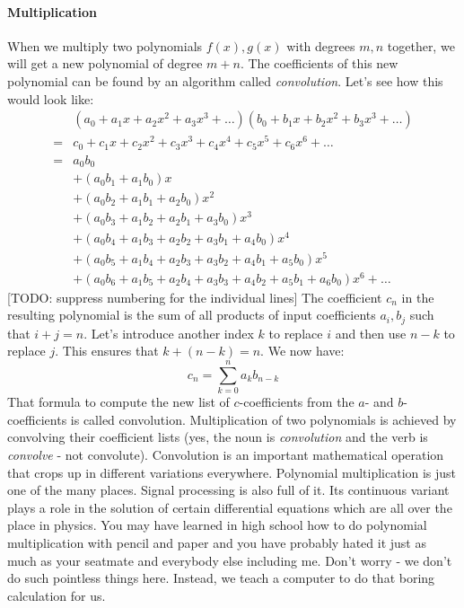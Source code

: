 \paragraph{Multiplication}
When we multiply two polynomials $f(x), g(x)$ with degrees $m,n$ together, we will get a new polynomial of degree $m+n$. The coefficients of this new polynomial can be found by an algorithm called \emph{convolution}. Let's see how this would look like:
\begin{eqnarray}
&  (a_0 + a_1 x + a_2 x^2 + a_3 x^3 + \ldots)
   (b_0 + b_1 x + b_2 x^2 + b_3 x^3 + \ldots)  \\
=&  c_0 + c_1 x + c_2 x^2 + c_3 x^3 + c_4 x^4 + c_5 x^5 + c_6 x^6 + \ldots \\
=&  a_0 b_0 \\
&+ (a_0 b_1 + a_1 b_0) x \\
&+ (a_0 b_2 + a_1 b_1 + a_2 b_0) x^2 \\
&+ (a_0 b_3 + a_1 b_2 + a_2 b_1 + a_3 b_0) x^3  \\
&+ (a_0 b_4 + a_1 b_3 + a_2 b_2 + a_3 b_1 + a_4 b_0) x^4 \\
&+ (a_0 b_5 + a_1 b_4 + a_2 b_3 + a_3 b_2 + a_4 b_1 + a_5 b_0) x^5 \\
&+ (a_0 b_6 + a_1 b_5 + a_2 b_4 + a_3 b_3 + a_4 b_2 + a_5 b_1 + a_6 b_0) x^6 + \ldots
\end{eqnarray}
[TODO: suppress numbering for the individual lines] \newline
The coefficient $c_n$ in the resulting polynomial is the sum of all products of input coefficients $a_i, b_j$ such that $i+j = n$. Let's introduce another index $k$ to replace $i$ and then use $n-k$ to replace $j$. This ensures that $k + (n-k) = n$. We now have:
\begin{equation}
  c_n = \sum_{k=0}^n a_k b_{n-k}
\end{equation}
That formula to compute the new list of $c$-coefficients from the $a$- and $b$-coefficients is called convolution. Multiplication of two polynomials is achieved by convolving their coefficient lists (yes, the noun is \emph{convolution} and the verb is \emph{convolve} - not convolute). Convolution is an important mathematical operation that crops up in different variations everywhere. Polynomial multiplication is just one of the many places. Signal processing is also full of it. Its continuous variant plays a role in the solution of certain differential equations which are all over the place in physics. You may have learned in high school how to do polynomial multiplication with pencil and paper and you have probably hated it just as much as your seatmate and everybody else including me. Don't worry - we don't do such pointless things here. Instead, we teach a computer to do that boring calculation for us.

